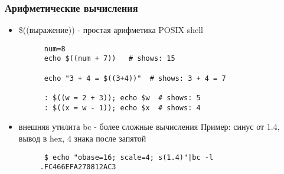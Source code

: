 \begin{frame}[fragile]
  \frametitle{Арифметические вычисления}
  \begin{itemize}
    \item \alert{\$((выражение))} - простая арифметика POSIX shell 
      \begin{verbatim}
      num=8
      echo $((num + 7))   # shows: 15

      echo "3 + 4 = $((3+4))"  # shows: 3 + 4 = 7
      
      : $((w = 2 + 3)); echo $w  # shows: 5
      : $((x = w - 1)); echo $x  # shows: 4
      \end{verbatim} \pause
    \item внешняя утилита \alert{bc} - более сложные вычисления\newline
      Пример: синус от 1.4, вывод в hex, 4 знака после запятой
      \begin{verbatim}
      $ echo "obase=16; scale=4; s(1.4)"|bc -l 
     .FC466EFA270812AC3
      \end{verbatim}
  \end{itemize}

\end{frame}
